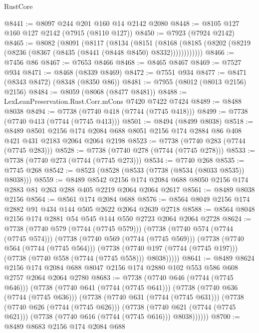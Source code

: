 \begin{lexlean}{RustCore}
\begin{coremodule}
@8441 := @8097 @244 @201 @160 @14 @2142 @2080
@8448 := @8105 @127 @160 @127 @2142 (@7915 (@8110 @127))
@8450 := @7923 (@7924 @2142)
@8465 := @8082
    (@8091
      (@8117
        (@8134
          (@8151
            (@8168 (@8185 (@8202 (@8219 (@8236 (@8367 (@8435 (@8441 (@8448 @8450) @8332))))))))))))
@8466 := @7456 @86
@8467 := @7653 @8466
@8468 := @8465 @8467
@8469 := @7527 @934
@8471 := @8468 (@8339 @8469)
@8472 := @7551 @934
@8477 := @8471 (@8343 @8472) (@8348 (@8350 @86))
@8481 := @7955 (@8012 (@8013 @2156) @2156)
@8484 := @8059 (@8068 (@8477 @8481))
@8488 := LexLeanPreservation.Rust.Corr.mCons @7420 @7422 @7424
@8489 := @8488 @8038
@8494 := @7738 (@7740 @418 (@7744 (@7745 @418)))
@8499 := @7738 (@7740 @413 (@7744 (@7745 @413)))
@8501 := @8494 (@8499 @8038)
@8518 := @8489
    @8501
    @2156
    @174
    @2084
    @688
    @8051
    @2156
    @174
    @2884
    @86
    @408
    @421
    @431
    @2183
    @2064
    @2064
    @2198
@8523 := @7738 (@7740 @283 (@7744 (@7745 @283)))
@8528 := @7738 (@7740 @278 (@7744 (@7745 @278)))
@8533 := @7738 (@7740 @273 (@7744 (@7745 @273)))
@8534 := @7740 @268
@8535 := @7745 @268
@8542 := @8523 (@8528 (@8533 (@7738 (@8534 (@8033 @8535)) @8038)))
@8559 := @8489
    @8542
    @2156
    @174
    @2084
    @688
    @8050
    @2156
    @174
    @2883
    @81
    @263
    @288
    @405
    @2219
    @2064
    @2064
    @2617
@8561 := @8489 @8038 @2156
@8564 := @8561 @174 @2084 @688
@8576 := @8564 @8049 @2156 @174 @2882 @91 @434 @144 @505 @2622 @2064 @2639 @2718
@8588 := @8564 @8048 @2156 @174 @2881 @54 @545 @144 @550 @2723 @2064 @2064 @2728
@8624 := @7738
    (@7740 @579 (@7744 (@7745 @579)))
    (@7738
      (@7740 @574 (@7744 (@7745 @574)))
      (@7738
        (@7740 @569 (@7744 (@7745 @569)))
        (@7738
          (@7740 @564 (@7744 (@7745 @564)))
          (@7738
            (@7740 @197 (@7744 (@7745 @197)))
            (@7738 (@7740 @558 (@7744 (@7745 @558))) @8038)))))
@8641 := @8489
    @8624
    @2156
    @174
    @2084
    @688
    @8047
    @2156
    @174
    @2880
    @102
    @553
    @586
    @608
    @2757
    @2064
    @2064
    @2780
@8683 := @7738
    (@7740 @646 (@7744 (@7745 @646)))
    (@7738
      (@7740 @641 (@7744 (@7745 @641)))
      (@7738
        (@7740 @636 (@7744 (@7745 @636)))
        (@7738
          (@7740 @631 (@7744 (@7745 @631)))
          (@7738
            (@7740 @626 (@7744 (@7745 @626)))
            (@7738
              (@7740 @621 (@7744 (@7745 @621)))
              (@7738 (@7740 @616 (@7744 (@7745 @616))) @8038))))))
@8700 := @8489
    @8683
    @2156
    @174
    @2084
    @688

\end{coremodule}
\end{lexlean}
